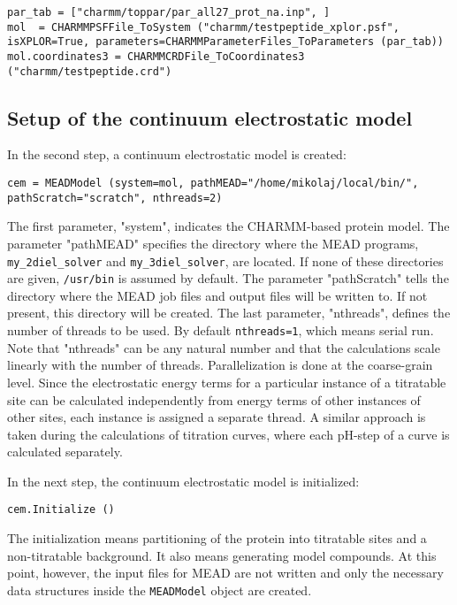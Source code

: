 \documentclass[a4paper,11pt]{article}
\begin{document}
{{\footnotesize \begin{lstlisting}
par_tab = ["charmm/toppar/par_all27_prot_na.inp", ]
mol  = CHARMMPSFFile_ToSystem ("charmm/testpeptide_xplor.psf", isXPLOR=True, parameters=CHARMMParameterFiles_ToParameters (par_tab))
mol.coordinates3 = CHARMMCRDFile_ToCoordinates3 ("charmm/testpeptide.crd")
\end{lstlisting} }


\subsection{Setup of the continuum electrostatic model}
In the second step, a continuum electrostatic model is created:

{\footnotesize \begin{lstlisting}
cem = MEADModel (system=mol, pathMEAD="/home/mikolaj/local/bin/", pathScratch="scratch", nthreads=2)
\end{lstlisting} }

\bigskip
%
The first parameter, "system",
indicates the CHARMM-based protein model.
%
The parameter "pathMEAD" specifies the directory where the MEAD programs,
\texttt{my\_2diel\_solver} and \texttt{my\_3diel\_solver}, are located.
%
If none of these directories are given, \texttt{/usr/bin} is assumed
by default.
%
The parameter "pathScratch" tells the directory where the MEAD job files
and output files will be written to.
%
If not present, this directory will be created.
%
The last parameter, "nthreads", defines the number of threads to be used.
%
By default \texttt{nthreads=1}, which means serial run.
%
Note that "nthreads" can be any natural number and that the calculations
scale linearly with the number of threads.
%
Parallelization is done at the coarse-grain level.
%
Since the electrostatic energy terms for a particular instance of a titratable
site can be calculated independently from energy terms of other instances of other
sites, each instance is assigned a separate thread.
%
A similar approach is taken during the calculations of titration curves,
where each pH-step of a curve is calculated separately.


\bigskip
In the next step, the continuum electrostatic model is initialized:

{\footnotesize \begin{lstlisting}
cem.Initialize ()
\end{lstlisting} }

\bigskip
The initialization means partitioning of the protein into titratable sites and
a non-titratable background.
%
It also means generating model compounds.
%
At this point, however, the input files for MEAD are not written and only
the necessary data structures inside the \texttt{MEADModel} object are created.

}
\end{document}
